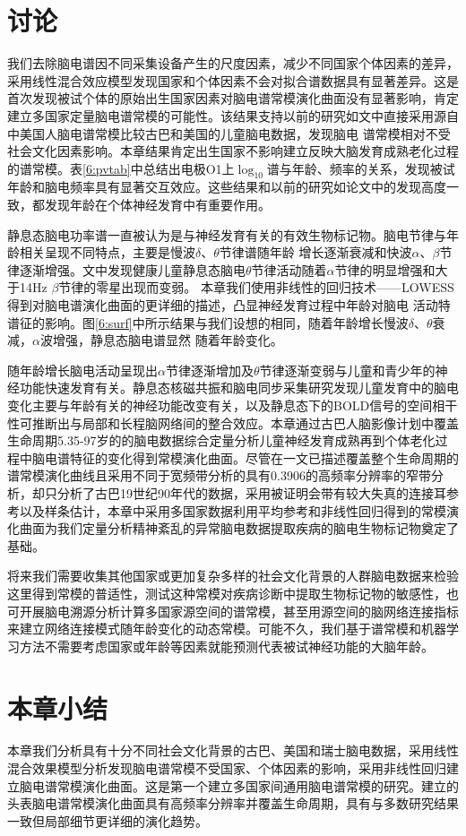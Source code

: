 \section{讨论}
我们去除脑电谱因不同采集设备产生的尺度因素，减少不同国家个体因素的差异，采用线性混合效应模型发现国家和个体因素不会对拟合谱数据具有显著差异。这是首次发现被试个体的原始出生国家因素对脑电谱常模演化曲面没有显著影响，肯定建立多国家定量脑电谱常模的可能性。该结果支持以前的研究如\cite{alvarez1987eeg}文中直接采用源自\cite{john1980developmental}中美国人脑电谱常模比较古巴和美国的儿童脑电数据，发现脑电
谱常模相对不受社会文化因素影响。本章结果肯定出生国家不影响建立反映大脑发育成熟老化过程的谱常模。表\ref{6:pvtab}中总结出电极O1上$\log_{10}$谱与年龄、频率的关系，发现被试年龄和脑电频率具有显著交互效应。这些结果和以前的研究如论文\cite{benninger1984eeg,smit2012brain,vandenbosch2019eeg}中的发现高度一致，都发现年龄在个体神经发育中有重要作用。 

静息态脑电功率谱一直被认为是与神经发育有关的有效生物标记物。脑电节律与年龄相关呈现不同特点，主要是慢波$\delta$、$\theta$节律谱随年龄
增长逐渐衰减和快波$\alpha$、$\beta$节律逐渐增强。\cite{lubar1985eeg}文中发现健康儿童静息态脑电$\theta$节律活动随着$\alpha$节律的明显增强和大于14Hz
$\beta$节律的零星出现而变弱。 本章我们使用非线性的回归技术——LOWESS得到对脑电谱演化曲面的更详细的描述，凸显神经发育过程中年龄对脑电
活动特谱征的影响。图\ref{6:surf}中所示结果与我们设想的相同，随着年龄增长慢波$\delta$、$\theta$衰减，$\alpha$波增强，静息态脑电谱显然
随着年龄变化。

随年龄增长脑电活动呈现出$\alpha$节律逐渐增加及$\theta$节律逐渐变弱与儿童和青少年的神经功能快速发育有关。静息态核磁共振和脑电同步采集研究发现儿童发育中的脑电变化主要与年龄有关的神经功能改变有关，以及静息态下的BOLD信号的空间相干性可推断出与局部和长程脑网络间的整合效应。本章通过古巴人脑影像计划中覆盖生命周期5.35-97岁的的脑电数据综合定量分析儿童神经发育成熟再到个体老化过程中脑电谱特征的变化得到常模演化曲面。尽管在\cite{szava1994high}一文已描述覆盖整个生命周期的谱常模演化曲线且采用不同于宽频带分析的具有0.3906的高频率分辨率的窄带分析，却只分析了古巴19世纪90年代的数据，采用被证明会带有较大失真的连接耳参考以及样条估计，本章中采用多国家数据利用平均参考和非线性回归得到的常模演化曲面为我们定量分析精神紊乱的异常脑电数据提取疾病的脑电生物标记物奠定了基础。

将来我们需要收集其他国家或更加复杂多样的社会文化背景的人群脑电数据来检验这里得到常模的普适性，测试这种常模对疾病诊断中提取生物标记物的敏感性，也可开展脑电溯源分析计算多国家源空间的谱常模，甚至用源空间的脑网络连接指标来建立网络连接模式随年龄变化的动态常模。可能不久，我们基于谱常模和机器学习方法不需要考虑国家或年龄等因素就能预测代表被试神经功能的大脑年龄。
\section{本章小结}
本章我们分析具有十分不同社会文化背景的古巴、美国和瑞士脑电数据，采用线性混合效果模型分析发现脑电谱常模不受国家、个体因素的影响，采用非线性回归建立脑电谱常模演化曲面。这是第一个建立多国家间通用脑电谱常模的研究。建立的头表脑电谱常模演化曲面具有高频率分辨率并覆盖生命周期，具有与多数研究结果一致但局部细节更详细的演化趋势。